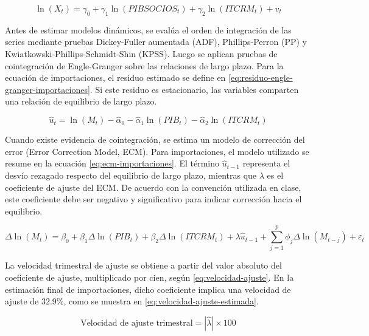\documentclass[11pt]{article}
\begin{document}
\begin{equation}
\ln(X_t)
= \gamma_0 + \gamma_1 \ln(PIBSOCIOS_t) + \gamma_2 \ln(ITCRM_t) + v_t
\label{eq:largo-plazo-exportaciones}
\end{equation}

Antes de estimar modelos dinámicos, se evalúa el orden de integración de las
series mediante pruebas Dickey-Fuller aumentada (ADF), Phillips-Perron (PP) y
Kwiatkowski-Phillips-Schmidt-Shin (KPSS). Luego se aplican pruebas de
cointegración de Engle-Granger sobre las relaciones de largo plazo. Para la
ecuación de importaciones, el residuo estimado se define en
\eqref{eq:residuo-engle-granger-importaciones}. Si este residuo es
estacionario, las variables comparten una relación de equilibrio de largo
plazo.

\begin{equation}
\widehat{u}_t
= \ln(M_t) - \widehat{\alpha}_0
- \widehat{\alpha}_1 \ln(PIB_t)
- \widehat{\alpha}_2 \ln(ITCRM_t)
\label{eq:residuo-engle-granger-importaciones}
\end{equation}

Cuando existe evidencia de cointegración, se estima un modelo de corrección del
error (Error Correction Model, ECM). Para importaciones, el modelo utilizado se
resume en la ecuación
\eqref{eq:ecm-importaciones}. El término \(\widehat{u}_{t-1}\) representa el
desvío rezagado respecto del equilibrio de largo plazo, mientras que
\(\lambda\) es el coeficiente de ajuste del ECM. De acuerdo con la convención
utilizada en clase, este coeficiente debe ser negativo y significativo para
indicar corrección hacia el equilibrio.

\begin{equation}
\Delta \ln(M_t)
= \beta_0
+ \beta_1 \Delta \ln(PIB_t)
+ \beta_2 \Delta \ln(ITCRM_t)
+ \lambda \widehat{u}_{t-1}
+ \sum_{j=1}^{p}\phi_j \Delta \ln(M_{t-j})
+ \varepsilon_t
\label{eq:ecm-importaciones}
\end{equation}

La velocidad trimestral de ajuste se obtiene a partir del valor absoluto del
coeficiente de ajuste, multiplicado por cien, según
\eqref{eq:velocidad-ajuste}. En la estimación final de importaciones, dicho
coeficiente implica una velocidad de ajuste de 32.9\%, como se muestra en
\eqref{eq:velocidad-ajuste-estimada}.

\begin{equation}
\text{Velocidad de ajuste trimestral}
= |\widehat{\lambda}| \times 100
\label{eq:velocidad-ajuste}
\end{equation}
\end{document}
